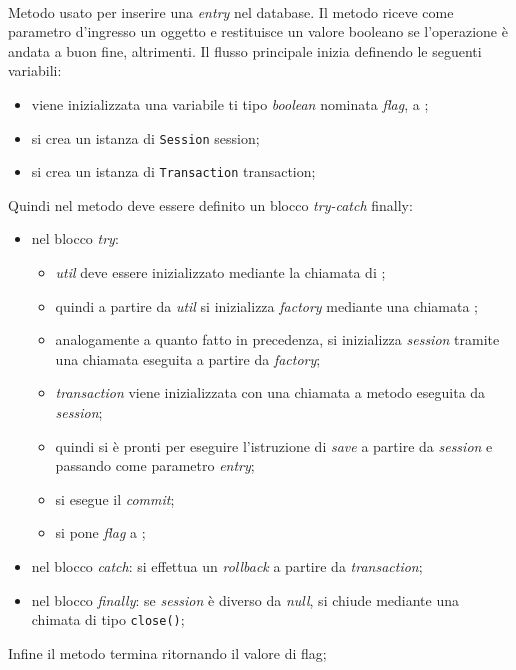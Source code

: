 \begin{description}
	\item{}\\
	Metodo usato per inserire una \textit{entry} nel database. Il metodo riceve come parametro d'ingresso un oggetto  e restituisce un valore booleano  se l'operazione è andata a buon fine,  altrimenti. Il flusso principale inizia definendo le seguenti variabili:
	\begin{itemize}
		\item viene inizializzata una variabile ti tipo \textit{boolean} nominata \textit{flag}, a ;
		\item si crea un istanza di \texttt{Session} session;
		\item si crea un istanza di \texttt{Transaction} transaction;
	\end{itemize}
	Quindi nel metodo deve essere definito un blocco \textit{try-catch} finally:
	\begin{itemize}
		\item nel blocco \textit{try}:
		\begin{itemize}
			\item \textit{util} deve essere inizializzato mediante la chiamata  di ;
			\item quindi a partire da \textit{util} si inizializza \textit{factory} mediante una chiamata ;
			\item analogamente a quanto fatto in precedenza, si inizializza \textit{session} tramite una chiamata  eseguita a partire da \textit{factory};
			\item \textit{transaction} viene inizializzata con una chiamata a metodo  eseguita da \textit{session};
			\item quindi si è pronti per eseguire l'istruzione di \textit{save} a partire da \textit{session} e passando come parametro \textit{entry};
			\item si esegue il \textit{commit};
			\item si pone \textit{flag} a ;
		\end{itemize}
		\item nel blocco \textit{catch}: si effettua un \textit{rollback} a partire da \textit{transaction};
		\item nel blocco \textit{finally}: se \textit{session} è diverso da \textit{null}, si chiude mediante una chimata di tipo \texttt{close()};
	\end{itemize}
	Infine il metodo termina ritornando il valore di flag;
	
\end{description}

